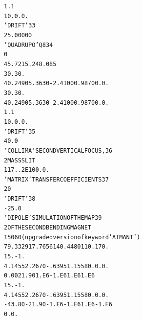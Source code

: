 \begin{tiny}
\begin{alltt}
    1.1                                                                         
    1  0. 0. 0.                                                                 
   'DRIFT'                                                                33
     25.00000                                                                   
   'QUADRUPO'                            Q8                               34
   0                                                        
    45.72  15.24  8.085                                                         
    30. 30.                                                                     
    4    0.2490   5.3630  -2.4100   0.9870   0.   0.                            
    30. 30.                                                                     
    4    0.2490   5.3630  -2.4100   0.9870   0.   0.                            
     1.1                                                                        
    1  0. 0. 0.                                                                 
   'DRIFT'                                                               35
     40.0                                                                       
   'COLLIMA'                             SECOND  VERTICAL  FOCUS,        36
    2                                    MASS  SLIT                             
   1  17.   .2E10   0. 0.                                                       
   'MATRIX'                              TRANSFER  COEFFICIENTS          37
   2 0                                                                          
   'DRIFT'                                                               38
   -25.0                                                                        
   'DIPOLE'                              SIMULATION  OF  THE  MAP        39
    2                                    OF  THE  SECOND  BENDING  MAGNET       
    150  60               (upgraded version of keyword 'AIMANT')
     79.3329   17.7656  140.4480   110.  170.                                   
    15. -1.                                                                     
    4  .1455   2.2670  -.6395  1.1558  0. 0.  0.                                
    0.00    21.90  1.E6 -1.E6  1.E6  1.E6                                       
    15. -1.                                                                     
    4  .1455   2.2670  -.6395  1.1558  0. 0.  0.                                
   -43.80  -21.90 -1.E6 -1.E6  1.E6 -1.E6                                       
    0. 0.                                                                     

\end{alltt}
\end{tiny}
